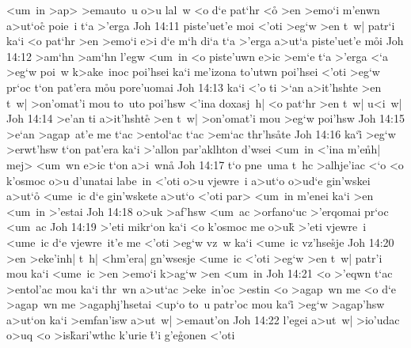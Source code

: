 <um~in
>ap>
>emauto~u
o>u
lal~w
<o
d`e
pat`hr
<o\r{}
>en
>emo`i
m'enwn
a>ut`oc\r{}
poie~i
t`a
>'erga\bibvsend
\vs Joh 14:11
piste'uet'e
moi
<'oti
>eg`w
>en
t~w|
patr`i
ka`i
<o
pat`hr
>en
>emo`i
e>i
d`e
m`h
di`a
t`a
>'erga
a>ut`a
piste'uet'e
m\r{o}i\bibvsend
{}
\vs Joh 14:12
>am`hn
>am`hn
l'egw
<um~in
<o
piste'uwn
e>ic
>em`e
t`a
>'erga
<`a
>eg`w
poi~w
k>ake~inoc
poi'hsei
ka`i
me'izona
to'utwn
poi'hsei
<'oti
>eg`w
pr`oc
t`on
pat'era
m\r{o}u
pore'uomai\bibvsend
\vs Joh 14:13
ka`i
<'o
ti
>`an
a>it'hshte
>en
t~w|
>on'omat'i
mou
to~uto
poi'hsw
<'ina
doxasj~h|
<o
pat`hr
>en
t~w|
u<i~w|\bibvsend
\vs Joh 14:14
>e'an
ti
a>it'hsht\r{e}
>en
t~w|
>on'omat'i
mou
>eg`w
poi'hsw\bibvsend
\vs Joh 14:15
>e`an
>agap~at'e
me
t`ac
>entol`ac
t`ac
>em`ac
thr'hs\r{a}te\bibvsend
{}
\vs Joh 14:16
ka`i\r{}
>eg`w
>erwt'hsw
t`on
pat'era
ka`i
>'allon
par'aklhton
d'wsei
<um~in
<'ina
m'e\r{n}h|
mej>
<um~wn
e>ic
t`on
a>i~wn\r{a}\bibvsend
{}
\vs Joh 14:17
t`o
pne~uma
t~hc
>alhje'iac
<`o
<o
k'osmoc
o>u
d'unatai
labe~in
<'oti
o>u
vjewre~i
a>ut`o
o>ud`e
gin'wskei
a>ut`o\r{}
<ume~ic
d`e
gin'wskete
a>ut`o
<'oti
par>
<um~in
m'enei
ka`i
>en
<um~in
>'estai\bibvsend
\vs Joh 14:18
o>uk
>af'hsw
<um~ac
>orfano`uc
>'erqomai
pr`oc
<um~ac\bibvsend
\vs Joh 14:19
>'eti
mikr`on
ka`i
<o
k'osmoc
me
o>uk\r{}
>'eti
vjewre~i
<ume~ic
d`e
vjewre~it'e
me
<'oti
>eg`w
vz~w
ka`i
<ume~ic
vz'hse\r{s}je\bibvsend
{}
\vs Joh 14:20
>en
>eke'inh|
t~h|
<hm'era|
gn'wsesje
<ume~ic
<'oti
>eg`w
>en
t~w|
patr'i
mou
ka`i
<ume~ic
>en
>emo`i
k>ag`w
>en
<um~in\bibvsend
\vs Joh 14:21
<o
>'eqwn
t`ac
>entol'ac
mou
ka`i
thr~wn
a>ut`ac
>eke~in'oc
>estin
<o
>agap~wn
me
<o
d`e
>agap~wn
me
>agaphj'hsetai
<up`o
to~u
patr'oc
mou
ka`i\r{}
>eg`w
>agap'hsw
a>ut`on
ka`i
>emfan'isw
a>ut~w|
>emaut'on\bibvsend
\vs Joh 14:22
l'egei
a>ut~w|
>io'udac
o>uq
<o
>is\r{k}ari'wthc
k'urie
\r{t}'i
g'e\r{g}onen
<'oti
